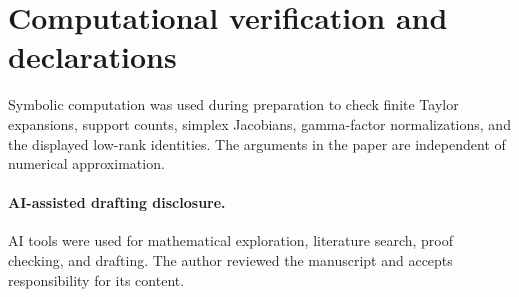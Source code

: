 \documentclass[11pt]{article}
\begin{document}
\section*{Computational verification and declarations}

Symbolic computation was used during preparation to check finite
Taylor expansions, support counts, simplex Jacobians, gamma-factor
normalizations, and the displayed low-rank identities.  The arguments
in the paper are independent of numerical approximation.

\paragraph{AI-assisted drafting disclosure.}
AI tools were used for mathematical exploration, literature search,
proof checking, and drafting.  The author reviewed the manuscript and
accepts responsibility for its content.
\end{document}
